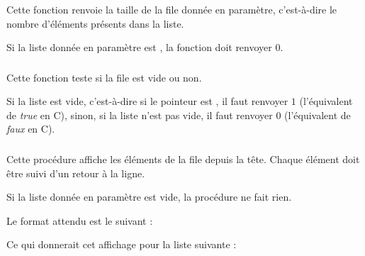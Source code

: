 \bigskip


\subsubsection*{}

\noindent Cette fonction renvoie la taille de la file donnée en paramètre, c'est-à-dire le nombre d'éléments présents dans la liste.

\smallskip

\noindent Si la liste donnée en paramètre est , la fonction doit renvoyer $ 0 $.

\bigskip


\subsubsection*{}

\noindent Cette fonction teste si la file est vide ou non.

\smallskip

\noindent Si la liste est vide, c'est-à-dire si le pointeur est , il faut renvoyer $ 1 $ (l'équivalent de \textit{true} en C), sinon, si la liste n'est pas vide, il faut renvoyer $ 0 $ (l'équivalent de \textit{faux} en C).

\bigskip


\subsubsection*{}

\noindent Cette procédure affiche les éléments de la file depuis la tête.
Chaque élément doit être suivi d'un retour à la ligne.

\smallskip

\noindent Si la liste donnée en paramètre est vide, la procédure ne fait rien.

\noindent Le format attendu est le suivant :

\bigskip

\noindent {}

\bigskip

\noindent Ce qui donnerait cet affichage pour la liste suivante :

\clearpage

